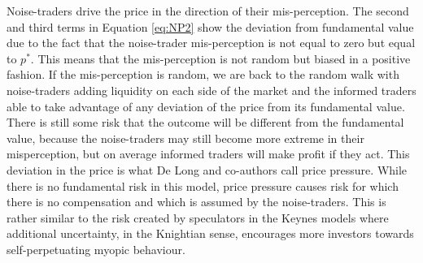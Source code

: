 \documentclass[12pt, a4paper, oneside]{article} %
\begin{document}
Noise-traders drive the price in the direction of their mis-perception.    The second and third terms in Equation \ref{eq:NP2} show the deviation from fundamental value due to the fact that the noise-trader mis-perception is not equal to zero but equal to $p^*$.  This means that the mis-perception is not random but biased in a positive fashion.  If the mis-perception is random, we are back to the random walk with noise-traders adding liquidity on each side of the market and the informed traders able to take advantage of any deviation of the price from its fundamental value.  There is still some risk that the outcome will be different from the fundamental value, because the noise-traders may still become more extreme in their misperception, but on average informed traders will make profit if they act.  This deviation in the price is what De Long and co-authors call price pressure.  While there is no fundamental risk in this model, price pressure causes risk for which there is no compensation and which is assumed by the noise-traders.  This is rather similar to the risk created by speculators in the Keynes models where additional uncertainty, in the Knightian sense, encourages more investors towards self-perpetuating myopic behaviour.   

\end{document}
